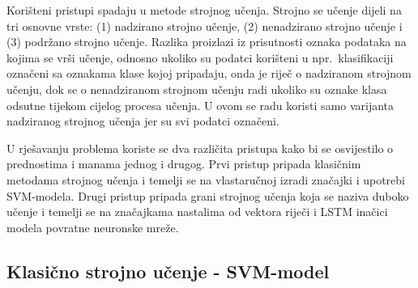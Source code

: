 \documentclass[times, utf8, zavrsni]{fer}
\begin{document}
Korišteni pristupi spadaju u metode strojnog učenja. Strojno se učenje dijeli na tri osnovne vrste: (1) nadzirano strojno učenje, (2) nenadzirano strojno učenje i (3) podržano strojno učenje. Razlika proizlazi iz prisutnosti oznaka podataka na kojima se vrši učenje, odnosno ukoliko su podatci korišteni u npr.~klasifikaciji označeni sa oznakama klase kojoj pripadaju, onda je riječ o nadziranom strojnom učenju, dok se o nenadziranom strojnom učenju radi ukoliko su oznake klasa odsutne tijekom cijelog procesa učenja. U ovom se radu koristi samo varijanta nadziranog strojnog učenja jer su svi podatci označeni.

U rješavanju problema koriste se dva različita pristupa kako bi se osvijestilo o prednostima i manama jednog i drugog. Prvi pristup pripada klasičnim metodama strojnog učenja i temelji se na vlastaručnoj izradi značajki i upotrebi \gls{SVM}-modela. Drugi pristup pripada grani strojnog učenja koja se naziva duboko učenje i  temelji se na značajkama nastalima od vektora riječi  i \gls{LSTM} inačici modela povratne neuronske mreže.



\subsection{Klasično strojno učenje - \gls{SVM}-model}
\end{document}
